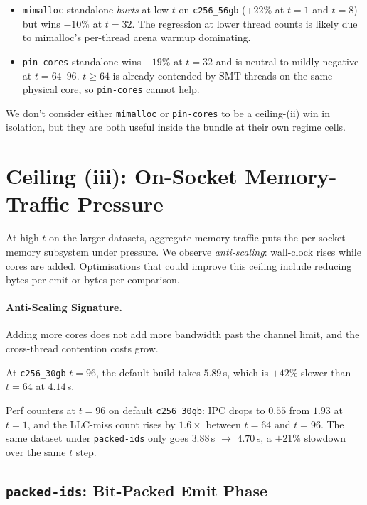 \begin{itemize}
  \item \texttt{mimalloc} standalone \emph{hurts} at low-$t$ on \texttt{c256\_56gb} (+22\% at $t{=}1$ and $t{=}8$) but wins $-10\%$ at $t{=}32$. The regression at lower thread counts is likely due to mimalloc's per-thread arena warmup dominating.
  \item \texttt{pin-cores} standalone wins $-19\%$ at $t{=}32$ and is neutral to mildly negative at $t{=}64$--$96$. $t \geq 64$ is already contended by SMT threads on the same physical core, so \texttt{pin-cores} cannot help. 
\end{itemize}

We don't consider either \texttt{mimalloc} or \texttt{pin-cores} to be a ceiling-(ii) win in isolation, but they are both useful inside the bundle at their own regime cells.

\section{Ceiling (iii): On-Socket Memory-Traffic Pressure\label{sec:exp:c3}}

At high $t$ on the larger datasets, aggregate memory traffic puts the per-socket memory subsystem under pressure. We observe \emph{anti-scaling}: wall-clock rises while cores are added. Optimisations that could improve this ceiling include reducing bytes-per-emit or bytes-per-comparison.

\paragraph{Anti-Scaling Signature.}\label{sec:exp:c3:anti}

Adding more cores does not add more bandwidth past the channel limit, and the cross-thread contention costs grow.

At \texttt{c256\_30gb} $t{=}96$, the default build takes $5.89$\,s, which is $+42\%$ slower than $t{=}64$ at $4.14$\,s.

Perf counters at $t=96$ on default \texttt{c256\_30gb}: IPC drops to $0.55$ from $1.93$ at $t=1$, and the LLC-miss count rises by $1.6\times$ between $t=64$ and $t=96$. The same dataset under \texttt{packed-ids} only goes $3.88$\,s $\rightarrow$ $4.70$\,s, a $+21\%$ slowdown over the same $t$ step.

\subsection{\texttt{packed-ids}: Bit-Packed Emit Phase\label{sec:exp:c3:packed}}

